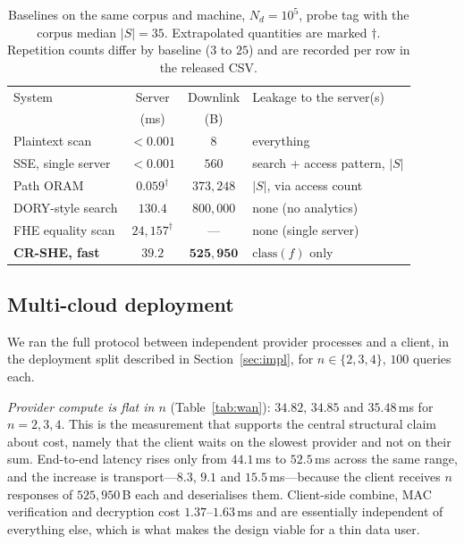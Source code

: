 \documentclass[journal]{IEEEtran}
\begin{document}
\begin{table}[t]
\centering
\caption{Baselines on the same corpus and machine, $N_d=10^5$, probe tag with
the corpus median $|S|=35$. Extrapolated quantities are marked $\dagger$.
Repetition counts differ by baseline ($3$ to $25$) and are recorded per row in
the released CSV.}
\label{tab:baselines}
\footnotesize
\renewcommand{\arraystretch}{1.2}
\begin{tabular*}{\columnwidth}{@{\extracolsep{\fill}}lccl@{}}
\toprule
System & Server & Downlink & Leakage to the server(s) \\
       & (ms)   & (B)      & \\
\midrule
Plaintext scan        & $<0.001$ & $8$              & everything \\
SSE, single server    & $<0.001$ & $560$            & search + access pattern, $|S|$ \\
Path ORAM             & $0.059^{\dagger}$ & $373{,}248$ & $|S|$, via access count \\
DORY-style search     & $130.4$  & $800{,}000$      & none (no analytics) \\
FHE equality scan     & $24{,}157^{\dagger}$ & --- & none (single server) \\
\midrule
\textbf{CR-SHE, fast} & $\mathbf{39.2}$ & $\mathbf{525{,}950}$ & $\mathrm{class}(f)$ only \\
\bottomrule
\end{tabular*}
\end{table}

\subsection{Multi-cloud deployment}
\label{sec:wanresult}
We ran the full protocol between independent provider processes and a client,
in the deployment split described in Section~\ref{sec:impl}, for
$n\in\{2,3,4\}$, $100$ queries each.

\emph{Provider compute is flat in $n$} (Table~\ref{tab:wan}): $34.82$, $34.85$
and $35.48$\,ms for $n=2,3,4$. This is the measurement that supports the central structural claim
about cost, namely that the client waits on the slowest provider and not on
their sum. End-to-end latency rises only from $44.1$\,ms to $52.5$\,ms across
the same range, and the increase is
transport---$8.3$, $9.1$ and $15.5$\,ms---because the client receives $n$
responses of $525{,}950$\,B each and deserialises them. Client-side combine, MAC verification and decryption cost
$1.37$--$1.63$\,ms and are essentially independent of everything else, which is
what makes the design viable for a thin data user.
\end{document}
